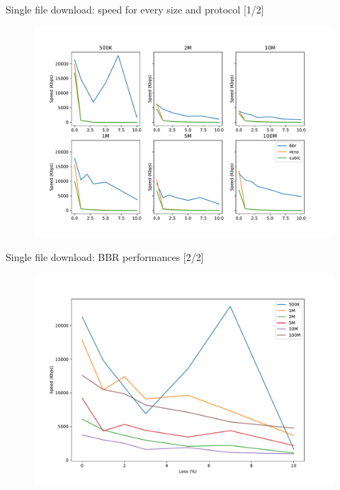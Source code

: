 \documentclass[13pt,aspectratio=43]{beamer}
\begin{document}
\begin{frame}{Single file download: speed for every size and protocol [1/2]}
  \begin{figure}
	  \includegraphics[width=\textwidth,height=\textheight,keepaspectratio]{../http_single_test/sizes_plot.pdf}
  \end{figure}
\end{frame}

\begin{frame}{Single file download: BBR performances [2/2]}
  \begin{figure}
	  \includegraphics[width=\textwidth,height=\textheight,keepaspectratio]{../http_single_test/size_bbr_plot.pdf}
  \end{figure}
\end{frame}
\end{document}
